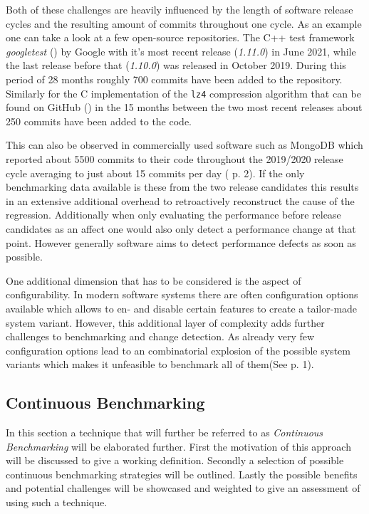 \documentclass[	runningheads,
				a4paper]{llncs}
\begin{document}
	Both of these challenges are heavily influenced by the length of software release cycles and the resulting amount of commits throughout one cycle. As an example one can take a look at a few open-source repositories. The C++ test framework \textit{googletest} (\cite{gtest}) by Google with it's most recent release (\textit{1.11.0}) in June 2021, while the last release before that (\textit{1.10.0}) was released in October 2019. During this period of 28 months roughly 700 commits have been added to the repository. Similarly for the C implementation of the \texttt{lz4} compression algorithm that can be found on GitHub (\cite{gitlz4}) in the 15 months between the two most recent releases about 250 commits have been added to the code.

	This can also be observed in commercially used software such as MongoDB which reported about 5500 commits to their code throughout the 2019/2020 release cycle averaging to just about 15 commits per day (\cite{daly2021} p. 2). If the only benchmarking data available is these from the two release candidates this results in an extensive additional overhead to retroactively reconstruct the cause of the regression. Additionally when only evaluating the performance before release candidates as an affect one would also only detect a performance change at that point. However generally software aims to detect performance defects as soon as possible. 

	One additional dimension that has to be considered is the aspect of configurability. In modern software systems there are often configuration options available which allows to en- and disable certain features to create a tailor-made system variant. However, this additional layer of complexity adds further challenges to benchmarking and change detection. As already very few configuration options lead to an combinatorial explosion of the possible system variants which makes it unfeasible to benchmark all of them(See \cite{apel2020} p. 1).

	\subsection{Continuous Benchmarking}
In this section a technique that will further be referred to as \textit{Continuous Benchmarking} will be elaborated further. First the motivation of this approach will be discussed to give a working definition. Secondly a selection of possible continuous benchmarking strategies will be outlined. Lastly the possible benefits and potential challenges will be showcased and weighted to give an assessment of using such a technique.
\end{document}
